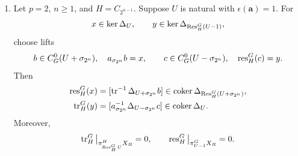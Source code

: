 \begin{proposition}
\begin{enumerate}[label=\textup{(\arabic*)},leftmargin=*]
\item Let $p=2$, $n\ge1$, and $H=C_{2^{n-1}}$.
Suppose $U$ is natural with
$\epsilon(\mathbf a)=1$. For
\[
x\in\ker\Delta_U,\qquad
y\in\ker\Delta_{\operatorname{Res}_H^G(U-1)},
\]
choose lifts
\[
b\in C_G^0(U+\sigma_{2^n}),\quad a_{\sigma_{2^n}} b=x,
\qquad
c\in C_G^0(U-\sigma_{2^n}),\quad\operatorname{res}_H^G(c)=y.
\]
Then
\begin{equation}\label{eq:sign-res-tr}
\begin{aligned}
\operatorname{res}_H^G(x)&=[\operatorname{tr}^{-1}\Delta_{U+\sigma_{2^n}}b]
\in\operatorname{coker}\Delta_{\operatorname{Res}_H^G(U+\sigma_{2^n})},\\
\operatorname{tr}_H^G(y)&=[a_{\sigma_{2^n}}^{-1}\Delta_{U-\sigma_{2^n}}c]
\in\operatorname{coker}\Delta_U.
\end{aligned}
\end{equation}
Moreover,
\[
\operatorname{tr}_H^G\big|_{\pi_{\operatorname{Res}_H^G U}^H X_R}=0,
\qquad
\operatorname{res}_H^G\big|_{\pi_{U-1}^G X_R}=0.
\]
\end{enumerate}
\end{proposition}

